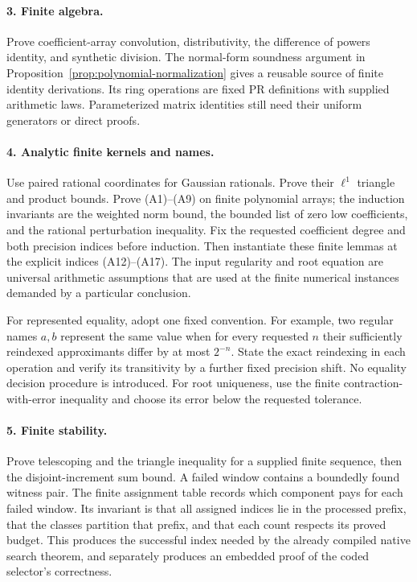 \paragraph{3. Finite algebra.}
Prove coefficient-array convolution, distributivity, the difference of
powers identity, and synthetic division. The normal-form soundness
argument in Proposition~\ref{prop:polynomial-normalization} gives a
reusable source of finite identity derivations. Its ring operations are
fixed PR definitions with supplied arithmetic laws. Parameterized matrix
identities still need their uniform generators or direct proofs.

\paragraph{4. Analytic finite kernels and names.}
Use paired rational coordinates for Gaussian rationals. Prove their
$\ell^1$ triangle and product bounds. Prove (A1)--(A9) on finite
polynomial arrays; the induction invariants are the weighted norm bound,
the bounded list of zero low coefficients, and the rational perturbation
inequality. Fix the requested coefficient degree and both precision
indices before induction. Then instantiate these finite lemmas at the
explicit indices (A12)--(A17). The input regularity and root equation are
universal arithmetic assumptions that are used at the finite numerical
instances demanded by a particular conclusion.

For represented equality, adopt one fixed convention. For example, two
regular names $a,b$ represent the same value when for every requested
$n$ their sufficiently reindexed approximants differ by at most
$2^{-n}$. State the exact reindexing in each operation and verify its
transitivity by a further fixed precision shift. No equality decision
procedure is introduced. For root uniqueness, use the finite
contraction-with-error inequality and choose its error below the
requested tolerance.

\paragraph{5. Finite stability.}
Prove telescoping and the triangle inequality for a supplied finite
sequence, then the disjoint-increment sum bound. A failed window
contains a boundedly found witness pair. The finite assignment table
records which component pays for each failed window. Its invariant is
that all assigned indices lie in the processed prefix, that the classes
partition that prefix, and that each count respects its proved budget.
This produces the successful index needed by the already compiled
native search theorem, and separately produces an embedded proof of
the coded selector's correctness.

